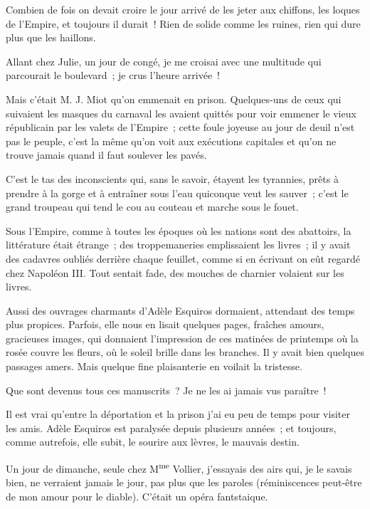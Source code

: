 \documentclass[french,twoside]{book} %
\begin{document}
\noindent Combien de fois on devait croire le jour arrivé de les jeter aux chiffons, les loques de l’Empire, et toujours il durait ! Rien de solide comme les ruines, rien qui dure plus que les haillons.\par
Allant chez Julie, un jour de congé, je me croisai avec une multitude qui parcourait le boulevard ; je crus l’heure arrivée !\par
Mais c’était M. J. Miot qu’on emmenait en prison. Quelques-uns de ceux qui suivaient les masques du carnaval les avaient quittés pour voir emmener le vieux républicain par les valets de l’Empire ; cette foule joyeuse au jour de deuil  n’est pas le peuple, c’est la même qu’on voit aux exécutions capitales et qu’on ne trouve jamais quand il faut soulever les pavés.\par
C’est le tas des inconscients qui, sans le savoir, étayent les tyrannies, prêts à prendre à la gorge et à entraîner sous l’eau quiconque veut les sauver ; c’est le grand troupeau qui tend le cou au couteau et marche sous le fouet.\par
Sous l’Empire, comme à toutes les époques où les nations sont des abattoirs, la littérature était étrange ; des troppemaneries emplissaient les livres ; il y avait des cadavres oubliés derrière chaque feuillet, comme si en écrivant on eût regardé chez Napoléon III. Tout sentait fade, des mouches de charnier volaient sur les livres.\par
Aussi des ouvrages charmants d’Adèle Esquiros dormaient, attendant des temps plus propices. Parfois, elle nous en lisait quelques pages, fraîches amours, gracieuses images, qui donnaient l’impression de ces matinées de printemps où la rosée couvre les fleurs, où le soleil brille dans les branches. Il y avait bien quelques passages amers. Mais quelque fine plaisanterie en voilait la tristesse.\par
Que sont devenus tous ces manuscrits ? Je ne les ai jamais vus paraître !\par
Il est vrai qu’entre la déportation et la prison  j’ai eu peu de temps pour visiter les amis. Adèle Esquiros est paralysée depuis plusieurs années ; et toujours, comme autrefois, elle subit, le sourire aux lèvres, le mauvais destin.\par
Un jour de dimanche, seule chez M\textsuperscript{me} Vollier, j’essayais des airs qui, je le savais bien, ne verraient jamais le jour, pas plus que les paroles (réminiscences peut-être de mon amour pour le diable). C’était un opéra fantstaique.\par
\end{document}
